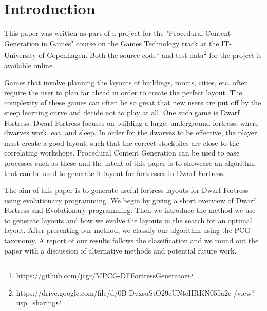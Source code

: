 \section{Introduction}
\label{01}
This paper was written as part of a project for the "Procedural Content Generation in Games" course on the Games Technology track at the IT-University of Copenhagen. Both the source code\footnote{https://github.com/jcgr/MPCG-DFFortressGenerator} and test data\footnote{https://drive.google.com/file/d/0B-DyxsuStO29cUNteHRKN055a2c /view?usp=sharing} for the project is available online.

Games that involve planning the layouts of buildings, rooms, cities, etc. often require the user to plan far ahead in order to create the perfect layout. The complexity of these games can often be so great that new users are put off by the steep learning curve and decide not to play at all. One such game is Dwarf Fortress\cite{DwarfFortress}. Dwarf Fortress focuses on building a large, underground fortress, where dwarves work, eat, and sleep. In order for the dwarves to be effective, the player must create a good layout, such that the correct stockpiles are close to the correlating workshops. Procedural Content Generation can be used to ease processes such as these and the intent of this paper is to showcase an algorithm that can be used to generate it layout for fortresses in Dwarf Fortress.

The aim of this paper is to generate useful fortress layouts for Dwarf Fortress using evolutionary programming. We begin by giving a short overview of Dwarf Fortress and Evolutionary programming. Then we introduce the method we use to generate layouts and how we evolve the layouts in the search for an optimal layout. After presenting our method, we classify our algorithm using the PCG taxonomy\cite{togelius2010search}. A report of our results follows the classification and we round out the paper with a discussion of alternative methods and potential future work.